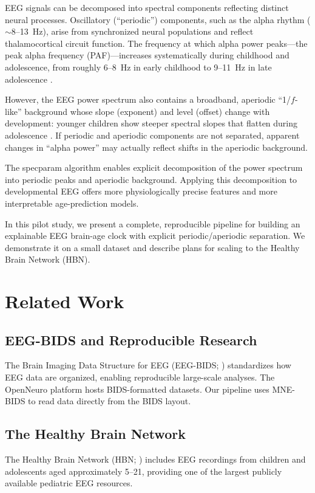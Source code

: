 \documentclass[12pt, a4paper]{article}
\begin{document}
EEG signals can be decomposed into spectral components reflecting distinct neural processes. Oscillatory (``periodic'') components, such as the alpha rhythm ($\sim$8--13~Hz), arise from synchronized neural populations and reflect thalamocortical circuit function. The frequency at which alpha power peaks---the peak alpha frequency (PAF)---increases systematically during childhood and adolescence, from roughly 6--8~Hz in early childhood to 9--11~Hz in late adolescence \citep{miskovic2015development, cellier2021alpha}.

However, the EEG power spectrum also contains a broadband, aperiodic ``1/$f$-like'' background whose slope (exponent) and level (offset) change with development: younger children show steeper spectral slopes that flatten during adolescence \citep{donoghue2020specparam, ostlund2022specparam}. If periodic and aperiodic components are not separated, apparent changes in ``alpha power'' may actually reflect shifts in the aperiodic background.

The specparam algorithm \citep{donoghue2020specparam} enables explicit decomposition of the power spectrum into periodic peaks and aperiodic background. Applying this decomposition to developmental EEG offers more physiologically precise features and more interpretable age-prediction models.

In this pilot study, we present a complete, reproducible pipeline for building an explainable EEG brain-age clock with explicit periodic/aperiodic separation. We demonstrate it on a small dataset and describe plans for scaling to the Healthy Brain Network (HBN).

\section{Related Work}

\subsection{EEG-BIDS and Reproducible Research}
The Brain Imaging Data Structure for EEG (EEG-BIDS; \citealt{pernet2019eegbids}) standardizes how EEG data are organized, enabling reproducible large-scale analyses. The OpenNeuro platform \citep{markiewicz2021openneuro} hosts BIDS-formatted datasets. Our pipeline uses MNE-BIDS \citep{appelhoff2019mnebids} to read data directly from the BIDS layout.

\subsection{The Healthy Brain Network}
The Healthy Brain Network (HBN; \citealt{alexander2017hbn}) includes EEG recordings from children and adolescents aged approximately 5--21, providing one of the largest publicly available pediatric EEG resources.
\end{document}
